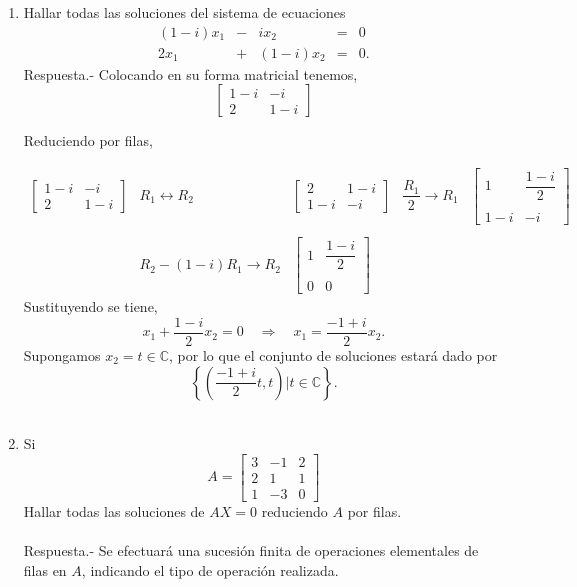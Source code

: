 \begin{enumerate}[\bfseries 1.]

    \item Hallar todas las soluciones del sistema de ecuaciones
    $$\begin{array}{rcrcl}
	(1-i)x_1&-&ix_2 &=& 0\\
	2x_1&+&(1-i)x_2 &=& 0.
    \end{array}$$
    \vspace{.4cm}
	Respuesta.-\; Colocando en su forma matricial tenemos,
	$$\left[\begin{array}{*{2}{c}}
	    1-i & -i\\
	    2 & 1-i
	\end{array}\right]$$

	Reduciendo por filas,

	$$\begin{array}{*{5}{c}}
	    \left[\begin{array}{*{2}{c}}
		1-i & -i\\
		2 & 1-i
	    \end{array}\right]
	    &R_1\leftrightarrow R_2&
	    \left[\begin{array}{*{2}{c}}
		2 & 1-i\\
		1-i & -i
	    \end{array}\right]
	    &\dfrac{R_1}{2}\to R_1&
	    \left[\begin{array}{*{2}{c}}
		1 & \dfrac{1-i}{2}\\\\
		1-i & -i
	    \end{array}\right]\\\\
	    &R_2-(1-i)R_1\to R_2&
	    \left[\begin{array}{*{2}{c}}
		1 & \dfrac{1-i}{2}\\\\
		0 & 0
	    \end{array}\right]
	\end{array}$$
	Sustituyendo se tiene,
	$$x_1+\dfrac{1-i}{2}x_2=0\quad \Rightarrow \quad x_1=\dfrac{-1+i}{2}x_2.$$
	Supongamos $x_2=t\in \mathbb{C}$, por lo que el conjunto de soluciones estará dado por
	$$\left\{\left(\dfrac{-1+i}{2}t,t\right)|t\in\mathbb{C}\right\}.$$\\


    \item Si
    $$A=\left[\begin{array}{rrr}
	    3 & -1 & 2 \\
	    2 & 1 & 1 \\
	    1 & -3 & 0
    \end{array}\right]$$
    Hallar todas las soluciones de $AX=0$ reduciendo $A$ por filas.\\\\
    	Respuesta.-\; Se efectuará una sucesión finita de operaciones elementales de filas en $A$, indicando el tipo de operación realizada.


\end{enumerate}
